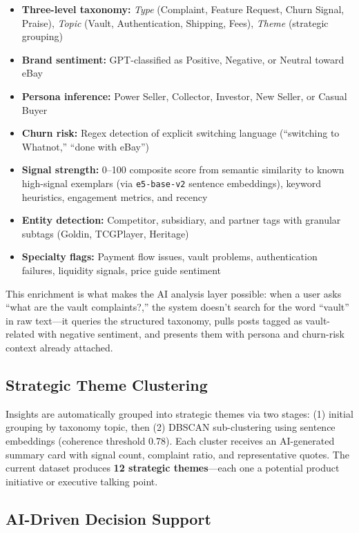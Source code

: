 \documentclass[11pt]{article}
\begin{document}
\begin{itemize}[nosep]
    \item \textbf{Three-level taxonomy:} \textit{Type} (Complaint, Feature Request, Churn Signal, Praise), \textit{Topic} (Vault, Authentication, Shipping, Fees), \textit{Theme} (strategic grouping)
    \item \textbf{Brand sentiment:} GPT-classified as Positive, Negative, or Neutral toward eBay
    \item \textbf{Persona inference:} Power Seller, Collector, Investor, New Seller, or Casual Buyer
    \item \textbf{Churn risk:} Regex detection of explicit switching language (``switching to Whatnot,'' ``done with eBay'')
    \item \textbf{Signal strength:} 0--100 composite score from semantic similarity to known high-signal exemplars (via \texttt{e5-base-v2} sentence embeddings), keyword heuristics, engagement metrics, and recency
    \item \textbf{Entity detection:} Competitor, subsidiary, and partner tags with granular subtags (Goldin, TCGPlayer, Heritage)
    \item \textbf{Specialty flags:} Payment flow issues, vault problems, authentication failures, liquidity signals, price guide sentiment
\end{itemize}

This enrichment is what makes the AI analysis layer possible: when a user asks ``what are the vault complaints?,'' the system doesn't search for the word ``vault'' in raw text---it queries the structured taxonomy, pulls posts tagged as vault-related with negative sentiment, and presents them with persona and churn-risk context already attached.

\subsection{Strategic Theme Clustering}
Insights are automatically grouped into strategic themes via two stages: (1) initial grouping by taxonomy topic, then (2) DBSCAN sub-clustering using sentence embeddings (coherence threshold 0.78). Each cluster receives an AI-generated summary card with signal count, complaint ratio, and representative quotes. The current dataset produces \textbf{12 strategic themes}---each one a potential product initiative or executive talking point.

\subsection{AI-Driven Decision Support}
\label{sec:ai}
\end{document}
